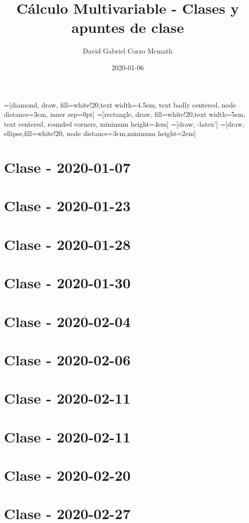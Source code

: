 \documentclass{book}
\title{Cálculo Multivariable - Clases y apuntes de clase}
\author{David Gabriel Corzo Mcmath}
\date{2020-01-06}
\begin{document}
\maketitle
\tableofcontents

=[diamond, draw, fill=white!20,text width=4.5em, text badly centered, node distance=3cm, inner sep=0pt]
=[rectangle, draw, fill=white!20,text width=5em, text centered, rounded corners, minimum height=4em]
=[draw, -latex']
=[draw, ellipse,fill=white!20, node distance=3cm,minimum height=2em]


\chapter{Clase - 2020-01-07}


\chapter{Clase - 2020-01-23}


\chapter{Clase - 2020-01-28}


\chapter{Clase - 2020-01-30}


\chapter{Clase - 2020-02-04}


\chapter{Clase - 2020-02-06}


\chapter{Clase - 2020-02-11}


\chapter{Clase - 2020-02-11}


\chapter{Clase - 2020-02-20}


\chapter{Clase - 2020-02-27}
\end{document}
